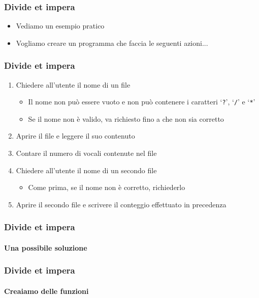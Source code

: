 \begin{exampleframe}
    \frametitle{Divide et impera}

    \begin{itemize}
        \item Vediamo un esempio pratico
        \bigskip
        \item Vogliamo creare un programma che faccia le seguenti azioni...
    \end{itemize}
\end{exampleframe}

\begin{exampleframe}
    \frametitle{Divide et impera}

    \begin{enumerate}
        \item Chiedere all’utente il nome di un file
        \begin{itemize}
            \item Il nome non può essere vuoto e non può contenere i caratteri `\texttt{?}', `\texttt{/}' e `\texttt{*}'
            \item Se il nome non è valido, va richiesto fino a che non sia corretto
        \end{itemize}
        \item Aprire il file e leggere il suo contenuto
        \item Contare il numero di vocali contenute nel file
        \item Chiedere all’utente il nome di un secondo file
        \begin{itemize}
            \item Come prima, se il nome non è corretto, richiederlo
        \end{itemize}
        \item Aprire il secondo file e scrivere il conteggio effettuato in precedenza
    \end{enumerate}
\end{exampleframe}

\begin{exampleframe}
    \frametitle{Divide et impera}
    \framesubtitle{Una possibile soluzione}

    \centering
\end{exampleframe}

\begin{exampleframe}
    \frametitle{Divide et impera}
    \framesubtitle{Creaiamo delle funzioni}

    \centering
\end{exampleframe}

